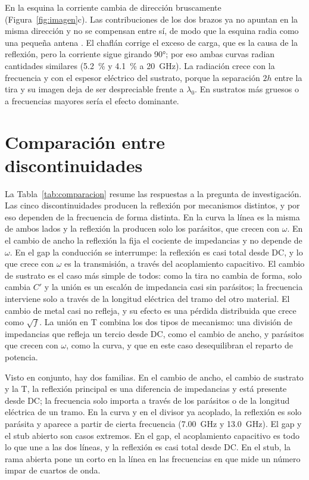 \documentclass[11pt,letterpaper]{article}
\begin{document}
En la esquina la corriente cambia de dirección bruscamente (Figura~\ref{fig:imagen}c). Las contribuciones de los dos brazos ya no apuntan en la misma dirección y no se compensan entre sí, de modo que la esquina radia como una pequeña antena \cite{lewin}. El chaflán corrige el exceso de carga, que es la causa de la reflexión, pero la corriente sigue girando \ang{90}; por eso ambas curvas radian cantidades similares (\SI{5.2}{\percent} y \SI{4.1}{\percent} a \SI{20}{GHz}). La radiación crece con la frecuencia y con el espesor eléctrico del sustrato, porque la separación $2h$ entre la tira y su imagen deja de ser despreciable frente a $\lambda_0$. En sustratos más gruesos o a frecuencias mayores sería el efecto dominante.



\section{Comparación entre discontinuidades}
\label{sec:comparacion}
La Tabla~\ref{tab:comparacion} resume las respuestas a la pregunta de investigación. Las cinco discontinuidades producen la reflexión por mecanismos distintos, y por eso dependen de la frecuencia de forma distinta. En la curva la línea es la misma de ambos lados y la reflexión la producen solo los parásitos, que crecen con $\omega$. En el cambio de ancho la reflexión la fija el cociente de impedancias y no depende de $\omega$. En el gap la conducción se interrumpe: la reflexión es casi total desde DC, y lo que crece con $\omega$ es la transmisión, a través del acoplamiento capacitivo. El cambio de sustrato es el caso más simple de todos: como la tira no cambia de forma, solo cambia $C'$ y la unión es un escalón de impedancia casi sin parásitos; la frecuencia interviene solo a través de la longitud eléctrica del tramo del otro material. El cambio de metal casi no refleja, y su efecto es una pérdida distribuida que crece como $\sqrt{f}$. La unión en T combina los dos tipos de mecanismo: una división de impedancias que refleja un tercio desde DC, como el cambio de ancho, y parásitos que crecen con $\omega$, como la curva, y que en este caso desequilibran el reparto de potencia.

Visto en conjunto, hay dos familias. En el cambio de ancho, el cambio de sustrato y la T, la reflexión principal es una diferencia de impedancias y está presente desde DC; la frecuencia solo importa a través de los parásitos o de la longitud eléctrica de un tramo. En la curva y en el divisor ya acoplado, la reflexión es solo parásita y aparece a partir de cierta frecuencia (\SI{7.00}{GHz} y \SI{13.0}{GHz}). El gap y el stub abierto son casos extremos. En el gap, el acoplamiento capacitivo es todo lo que une a las dos líneas, y la reflexión es casi total desde DC. En el stub, la rama abierta pone un corto en la línea en las frecuencias en que mide un número impar de cuartos de onda.
\end{document}
